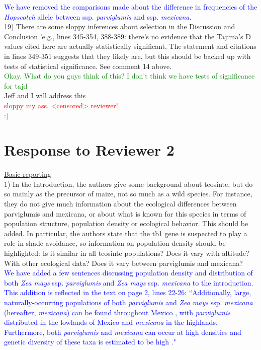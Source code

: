 \documentclass[11pt]{article}
\newcommand{\res}[1]{\noindent \textcolor{blue}{{#1}} \\}
\newcommand{\jri}[1]{\noindent \textcolor{red}{{#1}} \\}
\newcommand{\lev}[1]{\noindent \textcolor{green}{{#1}} \\}
\newcommand{\mbh}[1]{\noindent \textcolor{Dandelion}{{#1}}\\}
\begin{document}
\res{We have removed the comparisons made about the difference in frequencies of the \emph{Hopscotch} allele between ssp. \emph{parviglumis} and ssp. \emph{mexicana}.}

19) There are some sloppy inferences about selection in the Discussion and Conclusion 'e.g., lines 345-354, 388-389: there's no evidence that the Tajima's D values cited here are actually statistically significant. The statement and citations in lines 349-351 suggests that they likely are, but this should be backed up with tests of statistical significance. See comment 14 above.\\

\lev{Okay. What do you guys think of this? I don't think we have tests of significance for tajd}

\mbh{Jeff and I will address this}
\jri{sloppy my ass. <censored> reviewer!}
\lev{ :) }


\section*{Response to Reviewer 2} 

\underline{Basic reporting}\\

1) In the Introduction, the authors give some background about teosinte, but do so mainly as the precursor of maize, not so much as a wild species. For instance, they do not give much information about the ecological differences between parviglumis and mexicana, or about what is known for this species in terms of population structure, population density or ecological behavior. This should be added. In particular, the authors state that the tb1 gene is suspected to play a role in shade avoidance, so information on population density should be highlighted: Is it similar in all teosinte populations? Does it vary with altitude? With other ecological data? Does it vary between parviglumis and mexicana?\\

\res{We have added a few sentences discussing population density and distribution of both \emph{Zea mays} ssp. \emph{parviglumis} and \emph{Zea mays} ssp. \emph{mexicana} to the introduction. This addition is reflected in the text on page 2, lines 22-26: ``Additionally, large, naturally-occurring populations of both \emph{parviglumis} and \emph{Zea mays} ssp. \emph{mexicana} (hereafter, \emph{mexicana}) can be found throughout Mexico \citep{Wilkes1977, Hufford2013}, with \emph{parviglumis} distributed in the lowlands of Mexico and \emph{mexicana} in the highlands. Furthermore, both \emph{parviglumis} and \emph{mexicana} can occur at high densities and genetic diversity of these taxa is estimated to be high \citep{Hufford2012a, Ross-Ibarra2009}."}
\end{document}
